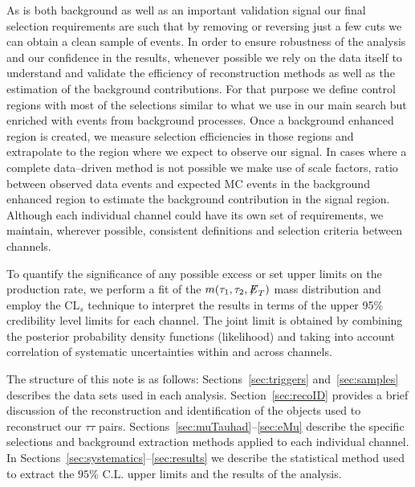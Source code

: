 As \zditau is both background as well as an important validation signal our final selection requirements are such that by removing or
reversing just a few cuts we can obtain a clean sample of \zditau events. In order to ensure robustness of the analysis and our
confidence in the results, whenever possible we rely on the data itself to understand and validate the efficiency of reconstruction
methods as well as the estimation of the background contributions. For that purpose we define control regions with most of the
selections similar to what we use in our main search but enriched with events from background processes. Once a background enhanced
region is created, we measure selection efficiencies in those regions and  extrapolate to the region  where we expect to observe our
signal. In cases where a complete data--driven method is not possible we make use of scale factors, ratio between observed data events
and expected MC events in the background enhanced region to estimate the background  contribution in the signal region. Although each
individual channel could have its own set of requirements, we maintain, wherever possible, consistent definitions and selection
criteria  between channels.

To quantify the significance of any possible excess or set upper limits on the production rate, we perform a fit of the $m(\tau_{1},\tau_{2},{\not\mathrel{E}}_T)$ mass 
distribution and employ the CL$_{s}$ technique to interpret the results in terms of the upper 95\% credibility level limits
for each channel. The joint limit is obtained by combining the posterior probability density functions (likelihood) and taking into
account correlation of systematic uncertainties within and across channels.

The structure of this note is as follows: Sections~\ref{sec:triggers} and~\ref{sec:samples} describes the data sets used in each analysis. 
Section~\ref{sec:recoID} provides a brief discussion of the reconstruction and identification of the objects used to reconstruct our  $\tau\tau$ 
pairs.
Sections~\ref{sec:muTauhad}--\ref{sec:eMu} describe the specific selections and background extraction methods applied  to each
individual channel. In Sections~\ref{sec:systematics}--\ref{sec:results} we describe the statistical method used to extract 
the $95\%$ C.L. upper limits and the results of the analysis. 
  
